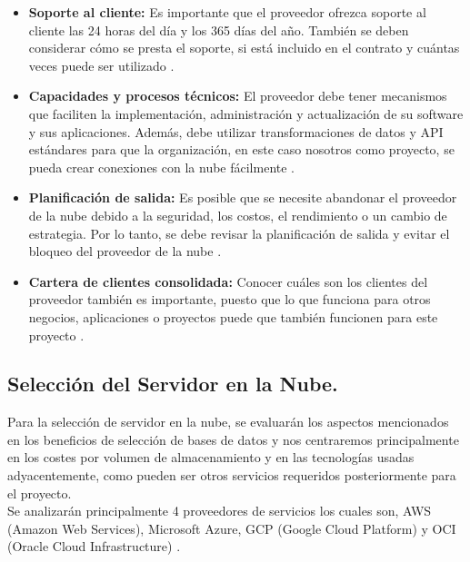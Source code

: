 \begin{itemize}
     \item      \textbf{Soporte al cliente:} Es importante que el proveedor ofrezca soporte al cliente las 24 horas del día y los 365 días del año. También se deben considerar cómo se presta el soporte, si está incluido en el contrato y cuántas veces puede ser utilizado  \cite{proveedor5}.
     \item \textbf{Capacidades y procesos técnicos:} El proveedor debe tener mecanismos que faciliten la implementación, administración y actualización de su software y sus aplicaciones. Además, debe utilizar transformaciones de datos y API estándares para que la organización, en este caso nosotros como proyecto, se pueda crear conexiones con la nube fácilmente \cite{proveedor4}.
     \item \textbf{Planificación de salida:} Es posible que se necesite abandonar el proveedor de la nube debido a la seguridad, los costos, el rendimiento o un cambio de estrategia. Por lo tanto, se debe revisar la planificación de salida y evitar el bloqueo del proveedor de la nube \cite{proveedor2}.
     \item \textbf{Cartera de clientes consolidada:} Conocer cuáles son los clientes del proveedor también es importante, puesto que lo que funciona para otros negocios, aplicaciones o proyectos puede que también funcionen para este proyecto \cite{proveedor5}.

 \end{itemize}

 \subsection{Selección del Servidor en la Nube.}
Para la selección de servidor en la nube, se evaluarán los aspectos mencionados en los beneficios de selección de bases de datos y nos centraremos principalmente en los costes por volumen de almacenamiento y en las tecnologías usadas adyacentemente, como pueden ser otros servicios requeridos posteriormente para el proyecto.\\
Se analizarán principalmente 4 proveedores de servicios los cuales son, AWS (Amazon Web Services), Microsoft Azure, GCP (Google Cloud Platform) y OCI (Oracle Cloud Infrastructure) \cite{104}.

\newpage


